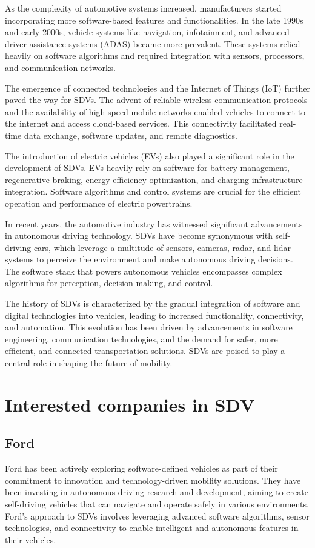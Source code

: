 \documentclass[
12pt,
oneside, 
onehalfspacing, 
nolistspacing, 
parskip, 
chapterinoneline, 
]{AASTCOMPUTER}
\begin{document}
As the complexity of automotive systems increased, manufacturers started incorporating more software-based features and functionalities. In the late 1990s and early 2000s, vehicle systems like navigation, infotainment, and advanced driver-assistance systems (ADAS) became more prevalent. These systems relied heavily on software algorithms and required integration with sensors, processors, and communication networks.

The emergence of connected technologies and the Internet of Things (IoT) further paved the way for SDVs. The advent of reliable wireless communication protocols and the availability of high-speed mobile networks enabled vehicles to connect to the internet and access cloud-based services. This connectivity facilitated real-time data exchange, software updates, and remote diagnostics.

The introduction of electric vehicles (EVs) also played a significant role in the development of SDVs. EVs heavily rely on software for battery management, regenerative braking, energy efficiency optimization, and charging infrastructure integration. Software algorithms and control systems are crucial for the efficient operation and performance of electric powertrains.

In recent years, the automotive industry has witnessed significant advancements in autonomous driving technology. SDVs have become synonymous with self-driving cars, which leverage a multitude of sensors, cameras, radar, and lidar systems to perceive the environment and make autonomous driving decisions. The software stack that powers autonomous vehicles encompasses complex algorithms for perception, decision-making, and control.

The history of SDVs is characterized by the gradual integration of software and digital technologies into vehicles, leading to increased functionality, connectivity, and automation. This evolution has been driven by advancements in software engineering, communication technologies, and the demand for safer, more efficient, and connected transportation solutions. SDVs are poised to play a central role in shaping the future of mobility.

\section{Interested companies in SDV}
\subsection{Ford}
Ford has been actively exploring software-defined vehicles as part of their commitment to innovation and technology-driven mobility solutions. They have been investing in autonomous driving research and development, aiming to create self-driving vehicles that can navigate and operate safely in various environments. Ford's approach to SDVs involves leveraging advanced software algorithms, sensor technologies, and connectivity to enable intelligent and autonomous features in their vehicles.
\end{document}
